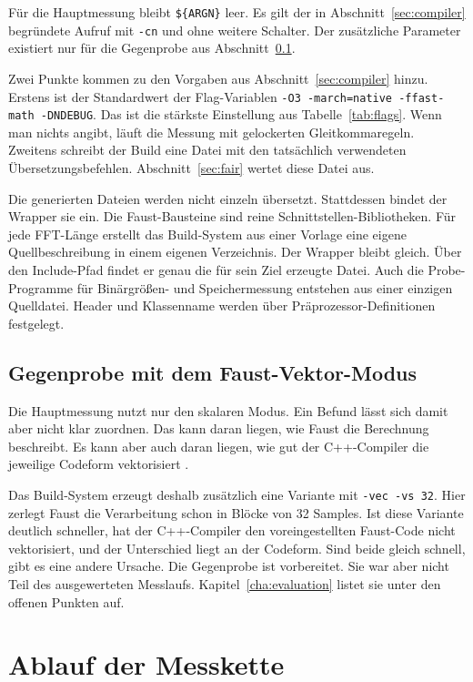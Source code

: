 Für die Hauptmessung bleibt \texttt{\$\{ARGN\}} leer. Es gilt der in Abschnitt~\ref{sec:compiler} begründete Aufruf mit \texttt{-cn} und ohne weitere Schalter. Der zusätzliche Parameter existiert nur für die Gegenprobe aus Abschnitt~\ref{subsec:vec-gegenprobe}.

Zwei Punkte kommen zu den Vorgaben aus Abschnitt~\ref{sec:compiler} hinzu. Erstens ist der Standardwert der Flag-Variablen \texttt{-O3 -march=native -ffast-math -DNDEBUG}. Das ist die stärkste Einstellung aus Tabelle~\ref{tab:flags}. Wenn man nichts angibt, läuft die Messung mit gelockerten Gleitkommaregeln. Zweitens schreibt der Build eine Datei mit den tatsächlich verwendeten Übersetzungsbefehlen. Abschnitt~\ref{sec:fair} wertet diese Datei aus.

Die generierten Dateien werden nicht einzeln übersetzt. Stattdessen bindet der Wrapper sie ein. Die Faust-Bausteine sind reine Schnittstellen-Bibliotheken. Für jede FFT-Länge erstellt das Build-System aus einer Vorlage eine eigene Quellbeschreibung in einem eigenen Verzeichnis. Der Wrapper bleibt gleich. Über den Include-Pfad findet er genau die für sein Ziel erzeugte Datei. Auch die Probe-Programme für Binärgrößen- und Speichermessung entstehen aus einer einzigen Quelldatei. Header und Klassenname werden über Präprozessor-Definitionen festgelegt.

\subsection{Gegenprobe mit dem Faust-Vektor-Modus}
\label{subsec:vec-gegenprobe}

Die Hauptmessung nutzt nur den skalaren Modus. Ein Befund lässt sich damit aber nicht klar zuordnen. Das kann daran liegen, wie Faust die Berechnung beschreibt. Es kann aber auch daran liegen, wie gut der C++-Compiler die jeweilige Codeform vektorisiert \parencite{scaringella:hal-02158949}.

Das Build-System erzeugt deshalb zusätzlich eine Variante mit \texttt{-vec -vs 32}. Hier zerlegt Faust die Verarbeitung schon in Blöcke von 32 Samples. Ist diese Variante deutlich schneller, hat der C++-Compiler den voreingestellten Faust-Code nicht vektorisiert, und der Unterschied liegt an der Codeform. Sind beide gleich schnell, gibt es eine andere Ursache. Die Gegenprobe ist vorbereitet. Sie war aber nicht Teil des ausgewerteten Messlaufs. Kapitel~\ref{cha:evaluation} listet sie unter den offenen Punkten auf.

\section{Ablauf der Messkette}
\label{sec:messkette}

